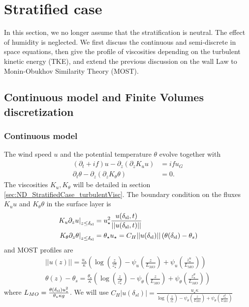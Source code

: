 \section{Stratified case}
In this section, we no longer assume that the stratification
is neutral. The effect of humidity is neglected.
We first discuss the continuous and semi-discrete in space
equations, then give the
profile of viscosities depending on the turbulent kinetic energy
(TKE), and extend the previous discussion on the wall Law to
Monin-Obukhov Similarity Theory (MOST).

\subsection{Continuous model and Finite Volumes discretization}
\subsubsection{Continuous model}
The wind speed $u$ and the potential temperature $\theta$ evolve
together with
\begin{equation}
\begin{aligned}
	\label{eq:ND_StratifiedCase_EkmanEq}
  (\partial_t + if) u - \partial_z (\partial_z K_u u) &= if u_G \\
  \partial_t \theta -\partial_z (\partial_z K_{\theta} \theta) &= 0.
\end{aligned}
\end{equation}
The viscosities $K_u, K_\theta$ will be detailed in section \ref{sec:ND_StratifiedCase_turbulentVisc}.
The boundary condition on the fluxes $K_u u$ and $K_\theta \theta$
in the surface layer is
\begin{equation}
\begin{aligned}
	\left.K_u \partial_z u \right|_{z\leq \delta_{\rm sl}}
	&= u_\star^2
	\frac{u(\delta_{\rm sl}, t)}{||u(\delta_{\rm sl}, t)||} \\
	\left.K_\theta \partial_z \theta
	\right|_{z\leq \delta_{\rm sl}}
	&= \theta_\star u_\star = C_H ||u(\delta_{\rm sl})||
	\left(\theta(\delta_{\rm sl}) - \theta_{s}\right)
\end{aligned}
\end{equation}
and MOST profiles are
\begin{equation}
\label{eq:ND_StratifiedCase_MOST}
\begin{aligned}
    ||u(z)|| = \frac{u_\star}{\kappa}
    \left(
    \log(\frac{z}{z_\star^u})
    - \psi_u(\frac{z}{L_{MO}})
    + \psi_u(\frac{z_\star^u}{L_{MO}})
    \right)
    \\
    \theta(z) - \theta_s = 
    \frac{\theta_\star}{\kappa}
    \left(
    \log(\frac{z}{z_\star^\theta})
    - \psi_\theta(\frac{z}{L_{MO}})
    + \psi_\theta(\frac{z_\star^\theta}{{L_{MO}}})
    \right)
\end{aligned}
\end{equation}
where $L_{MO} = \frac{\theta(\delta_{\rm sl})
u_\star^2}{\theta_\star \kappa g }$. We will use
$C_H|u(\delta_{sl})| = \frac{u_\star \kappa}{\log(\frac{z}{z_\star^\theta})
    - \psi_\theta(\frac{z}{L_{MO}})
    + \psi_\theta(\frac{z_\star^\theta}{{L_{MO}}})}$
